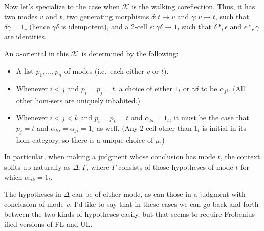 \documentclass{amsart}
\def\K{\ensuremath{\mathcal{K}}}
\theoremstyle{definition}
\begin{document}
Now let's specialize to the case when $\K$ is the walking coreflection.
Thus, it has two modes $v$ and $t$, two generating morphisms $\delta:t\to v$ and $\gamma:v\to t$, such that $\delta\gamma = 1_v$ (hence $\gamma\delta$ is idempotent), and a 2-cell $\epsilon : \gamma\delta \to 1_t$ such that $\delta*_l\epsilon$ and $\epsilon*_r\gamma$ are identities.

An $n$-oriental in this \K\ is determined by the following:
\begin{itemize}
\item A list $p_1,\dots,p_n$ of modes (i.e.\ each either $v$ or $t$).
\item Whenever $i<j$ and $p_i = p_j = t$, a choice of either $1_t$ or $\gamma\delta$ to be $\alpha_{ji}$.
  (All other hom-sets are uniquely inhabited.)
\item Whenever $i<j<k$ and $p_i = p_k = t$ and $\alpha_{ki} = 1_t$, it must be the case that $p_j = t$ and $\alpha_{kj} = \alpha_{ji} = 1_t$ as well.
  (Any 2-cell other than $1_t$ is initial in its hom-category, so there is a unique choice of $\mu$.)
\end{itemize}
In particular, when making a judgment whose conclusion has mode $t$, the context splits up naturally as $\Delta;\Gamma$, where $\Gamma$ consists of those hypotheses of mode $t$ for which $\alpha_{nk} = 1_t$.

The hypotheses in $\Delta$ can be of either mode, as can those in a judgment with conclusion of mode $v$.
I'd like to say that in these cases we can go back and forth between the two kinds of hypotheses easily, but that seems to require Frobenius-ified versions of FL and UL.
\end{document}
